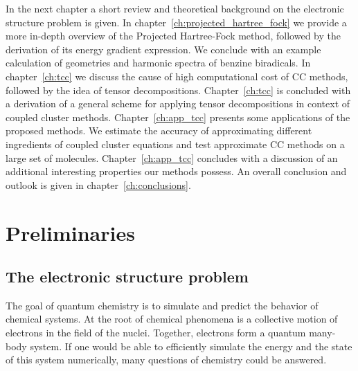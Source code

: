 In the next chapter a short review and theoretical background on the 
electronic structure problem is given. In 
chapter~\ref{ch:projected_hartree_fock} we provide a more in-depth 
overview of the Projected Hartree-Fock method, followed by the derivation of 
its energy gradient expression. We conclude with an example 
calculation of geometries and harmonic spectra of  benzine 
biradicals. In chapter~\ref{ch:tcc} we discuss the cause of high 
computational cost of CC methods, followed by the idea of tensor 
decompositions. Chapter~\ref{ch:tcc} is concluded with a derivation of a 
general scheme for applying tensor decompositions in context of coupled cluster 
methods. Chapter~\ref{ch:app_tcc} presents some applications of the proposed 
methods. We estimate the accuracy of approximating different ingredients of 
coupled cluster equations and test approximate CC methods on a large set of 
molecules. Chapter~\ref{ch:app_tcc} concludes with a discussion of an 
additional interesting properties our methods possess. An overall conclusion 
and outlook is given in chapter~\ref{ch:conclusions}.


\chapter{Preliminaries
\label{ch:preliminaries}}

\section{The electronic structure problem}
\label{sec:motivation}
The goal of quantum chemistry is to simulate and predict the behavior 
of chemical systems. At the root of chemical phenomena is a collective motion 
of electrons in the field of the nuclei. Together, electrons form a quantum 
many-body system. If one would be able to efficiently simulate the energy and 
the state of this system numerically, many questions of chemistry could be 
answered.

